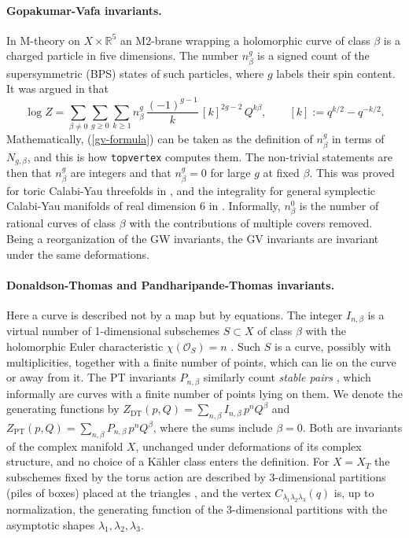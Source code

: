 \documentclass[11pt]{article}
\newcommand{\R}{\mathbb{R}}
\newcommand{\CO}{\mathcal{O}}
\newcommand{\topvertex}{\texttt{topvertex}}
\begin{document}
\paragraph{Gopakumar-Vafa invariants.} In M-theory on $X\times\R^5$ an M2-brane wrapping a
holomorphic curve of class $\beta$ is a charged particle in five dimensions. The number
$n^g_\beta$ is a signed count of the supersymmetric (BPS) states of such particles, where $g$
labels their spin content. It was argued in \cite{GV} that
\begin{equation}\label{gv-formula}
\log Z=\sum_{\beta\neq0}\sum_{g\geq0}\sum_{k\geq1}n^g_\beta\,\frac{(-1)^{g-1}}{k}\,[k]^{2g-2}\,Q^{k\beta},
\qquad [k]:=q^{k/2}-q^{-k/2}.
\end{equation}
Mathematically, (\ref{gv-formula}) can be taken as the definition of $n^g_\beta$ in terms of
$N_{g,\beta}$, and this is how \topvertex{} computes them. The non-trivial statements are then
that $n^g_\beta$ are integers and that $n^g_\beta=0$ for large $g$ at fixed $\beta$. This was
proved for toric Calabi-Yau threefolds in \cite{Peng,Kon}, and the integrality for general
symplectic Calabi-Yau manifolds of real dimension 6 in \cite{IP}. Informally, $n^0_\beta$ is the
number of rational curves of class $\beta$ with the contributions of multiple covers removed.
Being a reorganization of the GW invariants, the GV invariants are invariant under the same
deformations.

\paragraph{Donaldson-Thomas and Pandharipande-Thomas invariants.} Here a curve is described not
by a map but by equations. The integer $I_{n,\beta}$ is a virtual number of 1-dimensional
subschemes $S\subset X$ of class $\beta$ with the holomorphic Euler characteristic
$\chi(\CO_S)=n$ \cite{MNOP}. Such $S$ is a curve, possibly with multiplicities, together
with a finite number of points, which can lie on the curve or away from it. The PT invariants
$P_{n,\beta}$ similarly count \textit{stable pairs} \cite{PT}, which informally are curves with a
finite number of points lying on them. We denote the generating functions by
$Z_\text{DT}(p,Q)=\sum_{n,\beta}I_{n,\beta}\,p^nQ^\beta$ and
$Z_\text{PT}(p,Q)=\sum_{n,\beta}P_{n,\beta}\,p^nQ^\beta$, where the sums include $\beta=0$. Both
are invariants of the complex manifold $X$, unchanged under deformations of its complex
structure, and no choice of a K\"ahler class enters the definition. For $X=X_T$ the subschemes
fixed by the torus action are described by 3-dimensional partitions (piles of boxes) placed at
the triangles \cite{ORV,MNOP}, and the vertex $C_{\lambda_1\lambda_2\lambda_3}(q)$ is, up to
normalization, the generating function of the 3-dimensional partitions with the asymptotic
shapes $\lambda_1,\lambda_2,\lambda_3$.
\end{document}
